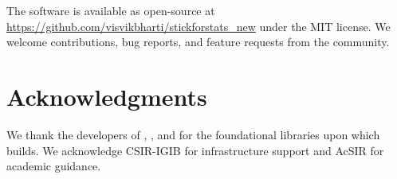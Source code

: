 \documentclass[article]{jss}
\begin{document}
The software is available as open-source at \url{https://github.com/visvikbharti/stickforstats_new} under the MIT license. We welcome contributions, bug reports, and feature requests from the community.


\section*{Acknowledgments}

We thank the developers of , , and  for the foundational libraries upon which  builds. We acknowledge CSIR-IGIB for infrastructure support and AcSIR for academic guidance.



\end{document}

